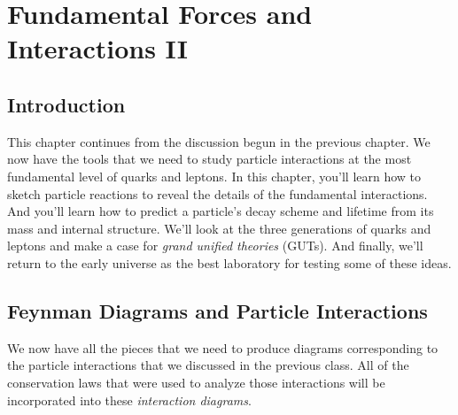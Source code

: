 
\chapter[Fund.\ Forces and Interactions II]{Fundamental Forces and Interactions II}
\label{chapter:interactions}

\section{Introduction}
\label{sec:interactions_intro}


This chapter continues from the discussion begun in the previous
chapter.  We now have the tools that we need to study particle
interactions at the most fundamental level of quarks and leptons.
In this chapter, you'll learn how to sketch particle reactions to
reveal the details of the fundamental interactions.  And you'll
learn how to predict a particle's decay scheme and lifetime from
its mass and internal structure.  We'll look at the three
generations of quarks and leptons and make a case for {\em grand
unified theories} (GUTs).  And finally, we'll return to the early
universe as the best laboratory for testing some of these ideas.


\section[Feynman diagrams]{Feynman Diagrams and Particle Interactions}
\label{sec:feynman_diagrams_interactions}

We now have all the pieces that we need to produce diagrams
corresponding to the particle interactions that we discussed in the
previous class.  All of the conservation laws that were used to
analyze those interactions will be incorporated into these
{\em interaction diagrams}.

